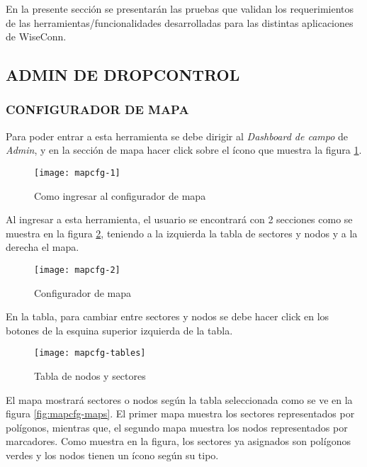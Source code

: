 
En la presente sección se presentarán las pruebas que validan los requerimientos de las herramientas/funcionalidades desarrolladas para las distintas aplicaciones de WiseConn.

\subsection{ADMIN DE DROPCONTROL}

\subsubsection{CONFIGURADOR DE MAPA}


Para poder entrar a esta herramienta se debe dirigir al \textit{Dashboard de campo} de \textit{Admin}, y en la sección de mapa hacer click sobre el ícono que muestra la figura \ref{fig:mapcfg-1}.

\begin{figure}[H]
	\centering
	\texttt{[image: mapcfg-1]}
	\caption{\label{fig:mapcfg-1} Como ingresar al configurador de mapa}
\end{figure}

Al ingresar a esta herramienta, el usuario se encontrará con 2 secciones como se muestra en la figura \ref{fig:mapcfg-2}, teniendo a la izquierda la tabla de sectores y nodos y a la derecha el mapa.

\begin{figure}[H]
	\centering
	\texttt{[image: mapcfg-2]}
	\caption{\label{fig:mapcfg-2} Configurador de mapa}
\end{figure}

En la tabla, para cambiar entre sectores y nodos se debe hacer click en los botones de la esquina superior izquierda de la tabla.

\begin{figure}[H]
	\centering
	\texttt{[image: mapcfg-tables]}
	\caption{\label{fig:mapcfg-tables} Tabla de nodos y sectores}
\end{figure}

El mapa mostrará sectores o nodos según la tabla seleccionada como se ve en la figura \ref{fig:mapcfg-maps}. El primer mapa muestra los sectores representados por polígonos, mientras que, el segundo mapa muestra los nodos representados por marcadores. Como muestra en la figura, los sectores ya asignados son polígonos verdes y los nodos tienen un ícono según su tipo.

